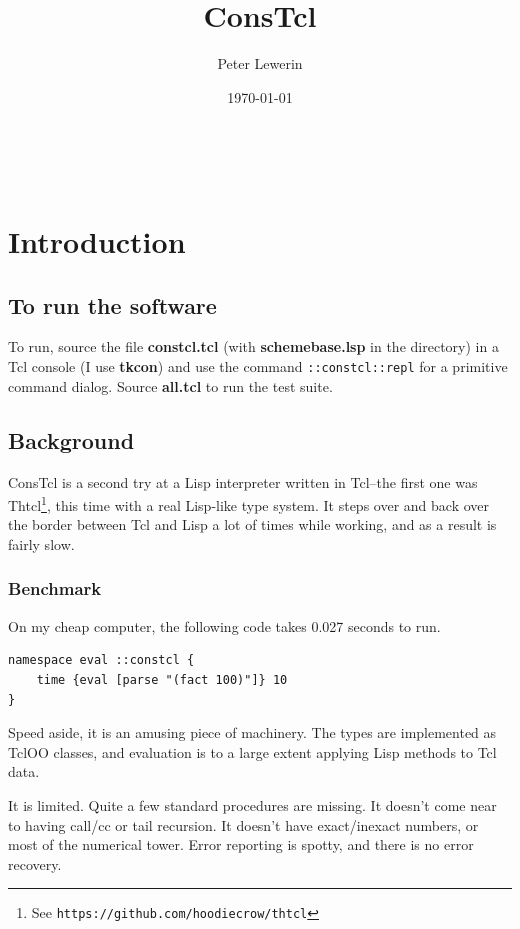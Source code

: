 \documentclass[twoside,9pt]{report}
\title{ConsTcl}
\author{Peter Lewerin}
\date{\today}
\begin{document}
\pagestyle{headings}
\maketitle
\tableofcontents
 
\section{Introduction}
\label{introduction}
\subsection{To run the software}
\label{to-run-the-software}

To run, source the file \textbf{constcl.tcl} (with \textbf{schemebase.lsp} in the directory) in a Tcl console (I use \textbf{tkcon}) and use the command \texttt{::constcl::repl} for a primitive command dialog. Source \textbf{all.tcl} to run the test suite.

\subsection{Background}
\label{background}

ConsTcl is a second try at a Lisp interpreter written in Tcl--the first one was Thtcl\footnote{See \texttt{https://github.com/hoodiecrow/thtcl}}, this time with a real Lisp-like type system. It steps over and back over the border between Tcl and Lisp a lot of times while working, and as a result is fairly slow.

\subsubsection{Benchmark}
\label{benchmark}

On my cheap computer, the following code takes 0.027 seconds to run.

\noindent\makebox[\linewidth]{\rule{\linewidth}{0.4pt}}
\begin{lstlisting}
namespace eval ::constcl {
    time {eval [parse "(fact 100)"]} 10
}
\end{lstlisting}
\noindent\makebox[\linewidth]{\rule{\linewidth}{0.4pt}}

Speed aside, it is an amusing piece of machinery. The types are implemented as TclOO classes, and evaluation is to a large extent applying Lisp methods to Tcl data.


It is limited. Quite a few standard procedures are missing. It doesn't come near to having call/cc or tail recursion. It doesn't have exact/inexact numbers, or most of the numerical tower. Error reporting is spotty, and there is no error recovery.
\end{document}
